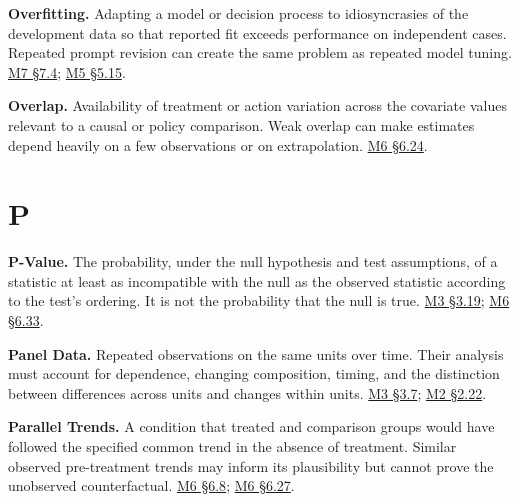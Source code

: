 \noindent\textbf{Overfitting.} Adapting a model or decision process to
idiosyncrasies of the development data so that reported fit exceeds
performance on independent cases. Repeated prompt revision can create
the same problem as repeated model tuning.
\href{Marketing_Analytics_Lecture_Notes.pdf\#M07-validation-cross-validation-and-leakage}{M7
§7.4};
\href{Marketing_Analytics_Lecture_Notes.pdf\#M05-repeated-prompt-revision-and-independent-text-evaluation}{M5
§5.15}.

\noindent\textbf{Overlap.} Availability of treatment or action variation across
the covariate values relevant to a causal or policy comparison. Weak
overlap can make estimates depend heavily on a few observations or on
extrapolation.
\href{Marketing_Analytics_Lecture_Notes.pdf\#M06-overlap-weight-concentration-and-missing-confounders}{M6
§6.24}.

\par{}
\hypertarget{module-p}{%
\section*{P}\label{module-p}}

\noindent\textbf{P-Value.} The probability, under the null hypothesis and test
assumptions, of a statistic at least as incompatible with the null as
the observed statistic according to the test's ordering. It is not the
probability that the null is true.
\href{Marketing_Analytics_Lecture_Notes.pdf\#M03-p-values-across-repeated-marketing-experiments}{M3
§3.19};
\href{Marketing_Analytics_Lecture_Notes.pdf\#M06-testing-electricity-price-interpretations-against-the-reported-tables}{M6
§6.33}.

\noindent\textbf{Panel Data.} Repeated observations on the same units over time.
Their analysis must account for dependence, changing composition,
timing, and the distinction between differences across units and changes
within units.
\href{Marketing_Analytics_Lecture_Notes.pdf\#M03-diagnostics-and-panel-data}{M3
§3.7};
\href{Marketing_Analytics_Lecture_Notes.pdf\#M02-customer-differences-and-changes-within-customers}{M2
§2.22}.

\noindent\textbf{Parallel Trends.} A condition that treated and comparison groups
would have followed the specified common trend in the absence of
treatment. Similar observed pre-treatment trends may inform its
plausibility but cannot prove the unobserved counterfactual.
\href{Marketing_Analytics_Lecture_Notes.pdf\#M06-difference-in-differences-and-a-counterfactual-trend}{M6
§6.8};
\href{Marketing_Analytics_Lecture_Notes.pdf\#M06-continuous-treatment-and-parallel-trends}{M6
§6.27}.

